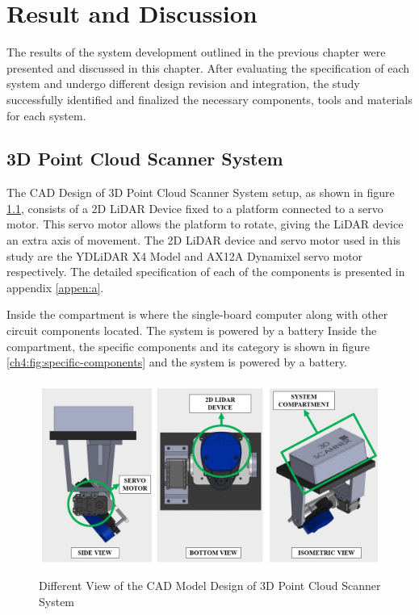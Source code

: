 \renewcommand{\thechapter}{\Roman{chapter}}
\chapter{Result and Discussion}
\renewcommand{\thechapter}{\arabic{chapter}}
\label{ch:Result and Discussion}
\thispagestyle{empty}

The results of the system development outlined in the previous chapter were presented and discussed in this chapter. After evaluating the specification of each system and undergo different design revision and integration, the study successfully identified and finalized the necessary components, tools and materials for each system.

\section{3D Point Cloud Scanner System}


The CAD Design of 3D Point Cloud Scanner System setup, as shown in figure \ref{ch4:fig:cad_storage_bin}, consists of a 2D LiDAR Device fixed to a platform connected to a servo motor. This servo motor allows the platform to rotate, giving the LiDAR device an extra axis of movement. The 2D LiDAR device and servo motor used in this study are the YDLiDAR X4 Model and AX12A Dynamixel servo motor respectively. The detailed specification of each of the components is presented in appendix \ref{appen:a}.

Inside the compartment is where the single-board computer along with other circuit components located. The system is powered by a battery Inside the compartment, the specific components and its category is shown in figure \ref{ch4:fig:specific-components} and the system is powered by a battery. \\

\begin{figure}[H]
	\centering
	\includegraphics[width=1\textwidth]{Figures/3d-pcss-cad-design}
	\caption{Different View of the CAD Model Design of 3D Point Cloud Scanner System}
	\label{ch4:fig:cad_storage_bin}
\end{figure}

